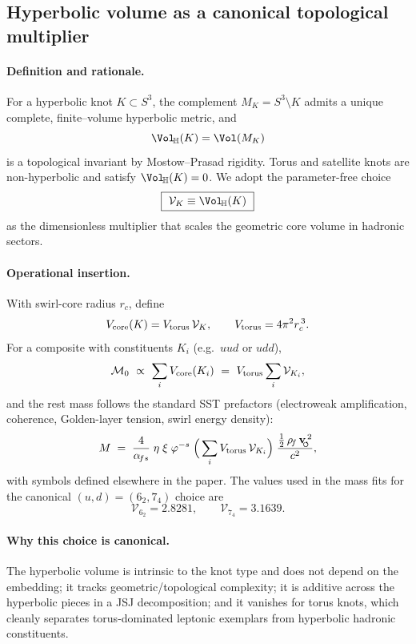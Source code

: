 \documentclass[11pt, preprint,titlepage]{revtex4-2}
\newcommand{\rhoF}{\rho_{\!f}}      %
\newcommand{\swirlarrow}{\!\!\scriptsize\boldsymbol{\circlearrowleft}}
\newcommand{\vswirl}{\mathbf{v}_{\swirlarrow}}
\begin{document}
	\subsection*{Hyperbolic volume as a canonical topological multiplier}
	\label{sec:hyp-volume}

		\paragraph{Definition and rationale.}
		For a hyperbolic knot \(K\subset S^3\), the complement \(M_K=S^3\!\setminus\!K\) admits a unique complete, finite–volume hyperbolic metric, and
		\[
		\Vol_{\!\mathbb{H}}(K)=\Vol(M_K)
		\]
		is a topological invariant by Mostow–Prasad rigidity. Torus and satellite knots are non-hyperbolic and satisfy \(\Vol_{\!\mathbb{H}}(K)=0\). We adopt the parameter-free choice
		\[
		\boxed{\ \mathcal V_K \equiv \Vol_{\!\mathbb{H}}(K)\ }
		\]
		as the dimensionless multiplier that scales the geometric core volume in hadronic sectors.

		\paragraph{Operational insertion.}
		With swirl-core radius \(r_c\), define
		\[
		V_{\rm core}(K)=V_{\rm torus}\,\mathcal V_K,\qquad
		V_{\rm torus}=4\pi^2 r_c^{\,3}.
		\]
		For a composite with constituents \(K_i\) (e.g.\ \(uud\) or \(udd\)),
		\[
		\mathcal M_0\ \propto\ \sum_i V_{\rm core}(K_i)
		\ =\ V_{\rm torus}\sum_i \mathcal V_{K_i},
		\]
		and the rest mass follows the standard SST prefactors (electroweak amplification, coherence, Golden-layer tension, swirl energy density):
		\[
		M \;=\; \frac{4}{\alpha_{\!fs}}\;\eta\;\xi\;\varphi^{-s}\;
		\Big(\sum_i V_{\rm torus}\,\mathcal{V}_{K_i}\Big)\;
		\frac{\tfrac12\,\rhoF\,\vswirl^{\,2}}{c^2},
		\]
		with symbols defined elsewhere in the paper. The values used in the mass fits for the canonical \((u,d)=(6_2,7_4)\) choice are
		\[
		\mathcal{V}_{6_2}=2.8281,\qquad
		\mathcal{V}_{7_4}=3.1639.
		\]

		\paragraph{Why this choice is canonical.}
		The hyperbolic volume is intrinsic to the knot type and does not depend on the embedding; it tracks geometric/topological complexity; it is additive across the hyperbolic pieces in a JSJ decomposition; and it vanishes for torus knots, which cleanly separates torus-dominated leptonic exemplars from hyperbolic hadronic constituents.
\end{document}

